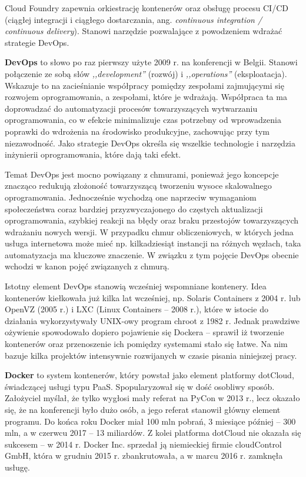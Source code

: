 \documentclass[12pt,a4paper,twoside,titlepage,openright]{book}
\begin{document}
Cloud Foundry zapewnia orkiestrację kontenerów oraz obsługę procesu CI/CD (ciągłej integracji i ciągłego dostarczania, ang. \textit{continuous integration / continuous delivery}).\cite{cloudFoundry} Stanowi narzędzie pozwalające z powodzeniem wdrażać strategie DevOps. 

\textbf{DevOps} to słowo po raz pierwszy użyte 2009 r. na konferencji w Belgii. Stanowi połączenie ze sobą słów \textit{,,development''} (rozwój) i \textit{,,operations''} (eksploatacja). Wskazuje to na zacieśnianie współpracy pomiędzy zespołami zajmującymi się rozwojem oprogramowania, a zespołami, które je wdrażają. Współpraca ta ma doprowadzać do automatyzacji procesów towarzyszących wytwarzaniu oprogramowania, co w efekcie minimalizuje czas potrzebny od wprowadzenia poprawki do wdrożenia na środowisko produkcyjne, zachowując przy tym niezawodność. Jako strategie DevOps określa się wszelkie technologie i narzędzia inżynierii oprogramowania, które dają taki efekt. \cite{devOpsPackt}

Temat DevOps jest mocno powiązany z chmurami, ponieważ jego koncepcje znacząco redukują złożoność towarzyszącą tworzeniu wysoce skalowalnego oprogramowania. Jednocześnie wychodzą one naprzeciw wymaganiom społeczeństwa coraz bardziej przyzwyczajonego do częstych aktualizacji oprogramowania, szybkiej reakcji na błędy oraz braku przestojów towarzyszących wdrażaniu nowych wersji. W przypadku chmur obliczeniowych, w których jedna usługa internetowa może mieć np. kilkadziesiąt instancji na różnych węzłach, taka automatyzacja ma kluczowe znaczenie. W związku z tym pojęcie DevOps obecnie wchodzi w kanon pojęć związanych z chmurą.

Istotny element DevOps stanowią wcześniej wspomniane kontenery. Idea kontenerów kiełkowała już kilka lat wcześniej, np. Solaris Containers z 2004 r. lub OpenVZ (2005 r.) i LXC (Linux Containers -- 2008 r.), które w istocie do działania wykorzystywały UNIX-owy program chroot z 1982 r.\cite{siteOperatingSystemVirtualizationWiki} Jednak prawdziwe ożywienie spowodowało dopiero pojawienie się Dockera -- sprawił iż tworzenie kontenerów oraz przenoszenie ich pomiędzy systemami stało się łatwe. Na nim bazuje kilka projektów intensywnie rozwijanych w czasie pisania niniejszej pracy.

\textbf{Docker} to system kontenerów, który powstał jako element platformy dotCloud, świadczącej usługi typu PaaS. Spopularyzował się w dość osobliwy sposób. Założyciel myślał, że tylko wygłosi mały referat na PyCon w 2013 r., lecz okazało się, że na konferencji było dużo osób, a jego referat stanowił główny element programu. Do końca roku Docker miał 100 mln pobrań, 3 miesiące później -- 300 mln, a w czerwcu 2017 -- 13 miliardów.\cite{siteDockerHistory} Z kolei platforma dotCloud nie okazała się sukcesem -- w 2014 r. Docker Inc. sprzedał ją niemieckiej firmie cloudControl GmbH, która w grudniu 2015 r. zbankrutowała, a w marcu 2016 r. zamknęła usługę.\cite{siteCloudControlWiki}
\end{document}
